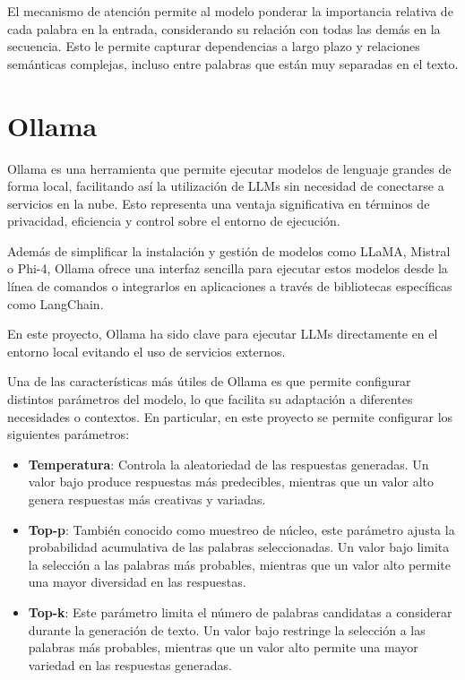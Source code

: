 El mecanismo de atención permite al modelo ponderar la importancia relativa de cada palabra 
en la entrada, considerando su relación con todas las demás en la secuencia. Esto le permite 
capturar dependencias a largo plazo y relaciones semánticas complejas, incluso entre palabras 
que están muy separadas en el texto.

\section{Ollama}

Ollama es una herramienta que permite ejecutar modelos de lenguaje grandes de forma local, 
facilitando así la utilización de LLMs sin necesidad de conectarse a servicios en la nube. 
Esto representa una ventaja significativa en términos de privacidad, eficiencia y control 
sobre el entorno de ejecución.

Además de simplificar la instalación y gestión de modelos como LLaMA, Mistral o Phi-4, 
Ollama ofrece una interfaz sencilla para ejecutar estos modelos desde la línea de comandos 
o integrarlos en aplicaciones a través de bibliotecas específicas como LangChain. 

En este proyecto, Ollama ha sido clave para ejecutar LLMs directamente en el entorno local
evitando el uso de servicios externos.

Una de las características más útiles de Ollama es que permite configurar distintos parámetros 
del modelo, lo que facilita su adaptación a diferentes necesidades o contextos. 
En particular, en este proyecto se permite configurar los siguientes parámetros:

\begin{itemize}
	\item \textbf{Temperatura}: Controla la aleatoriedad de las respuestas generadas. Un valor bajo 
		produce respuestas más predecibles, mientras que un valor alto genera respuestas 
		más creativas y variadas.
	\item \textbf{Top-p}: También conocido como muestreo de núcleo, este parámetro ajusta la
		probabilidad acumulativa de las palabras seleccionadas. Un valor bajo limita la 
		selección a las palabras más probables, mientras que un valor alto permite una 
		mayor diversidad en las respuestas.
	\item \textbf{Top-k}: Este parámetro limita el número de palabras candidatas a considerar
		durante la generación de texto. Un valor bajo restringe la selección a las palabras 
		más probables, mientras que un valor alto permite una mayor variedad en las 
		respuestas generadas.
\end{itemize}

